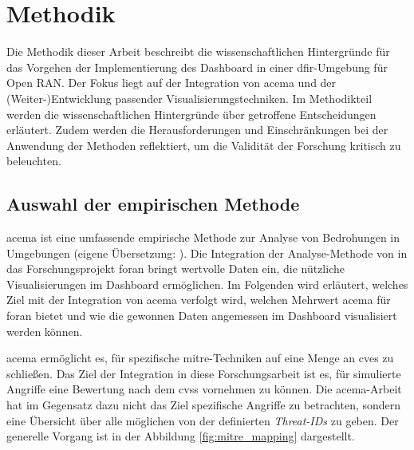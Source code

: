 \chapter{Methodik}
\label{chap:methodik}
Die Methodik dieser Arbeit beschreibt die wissenschaftlichen Hintergründe für das Vorgehen der Implementierung des Dashboard in einer \gls{dfir}-Umgebung für Open RAN. Der Fokus liegt auf der Integration von \gls{acema} und der (Weiter-)Entwicklung passender Visualisierungstechniken. Im Methodikteil werden die wissenschaftlichen Hintergründe über getroffene Entscheidungen erläutert. Zudem werden die Herausforderungen und Einschränkungen bei der Anwendung der Methoden reflektiert, um die Validität der Forschung kritisch zu beleuchten.
\section{Auswahl der empirischen Methode}
\label{sec:auswahlDerEmpirischenMethode}
\gls{acema} ist \glqq eine umfassende empirische Methode zur Analyse von Bedrohungen in \oran Umgebungen \grqq (eigene Übersetzung: \autocite{klementSecuring6GTransition2024}). Die Integration der Analyse-Methode von \citeauthor{klementSecuring6GTransition2024} in das Forschungsprojekt \gls{foran} bringt wertvolle Daten ein, die nützliche Visualisierungen im Dashboard ermöglichen. Im Folgenden wird erläutert, welches Ziel mit der Integration von \gls{acema} verfolgt wird, welchen Mehrwert \gls{acema} für \gls{foran} bietet und wie die gewonnen Daten angemessen im Dashboard visualisiert werden können.
\par \gls{acema} ermöglicht es, für spezifische \gls{mitre}-Techniken auf eine Menge an \glspl{cve} zu schließen. Das Ziel der Integration in diese Forschungsarbeit ist es, für simulierte Angriffe eine Bewertung nach dem \gls{cvss} vornehmen zu können. Die \gls{acema}-Arbeit hat im Gegensatz dazu nicht das Ziel spezifische Angriffe zu betrachten, sondern eine Übersicht über alle möglichen von der \oran definierten \textit{Threat-IDs} zu geben. Der generelle Vorgang ist in der Abbildung \ref{fig:mitre_mapping} dargestellt. 


